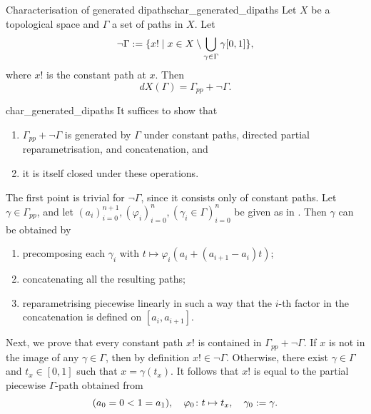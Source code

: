 \begin{clem}{Characterisation of generated dipaths}{char_generated_dipaths}
	Let \( X \) be a topological space and \( \Gamma \) a set of paths in \( X \).
	Let
	\begin{equation*}
		\neg \Gamma :=
		\{ x! \mid x \in X \setminus \bigcup_{\gamma \in \Gamma} \gamma[0, 1] \},
	\end{equation*}
	where \( x! \) is the constant path at \( x \).
	Then
	\begin{equation*}
		dX(\Gamma) = \Gamma_\textit{pp} + \neg \Gamma.
	\end{equation*}
\end{clem}
\begin{lemproof}{char_generated_dipaths}
It suffices to show that
\begin{enumerate}
	\item \( \Gamma_\textit{pp} + \neg \Gamma \) is generated by \( \Gamma \) under constant paths, directed partial reparametrisation, and concatenation, and
	\item it is itself closed under these operations.
\end{enumerate}
The first point is trivial for \( \neg \Gamma \), since it consists only of constant paths.
Let \( \gamma \in \Gamma_\textit{pp} \), and let \( (a_i)_{i=0}^{n+1}, (\varphi_i)_{i=0}^n, (\gamma_i \in \Gamma)_{i=0}^n \) be given as in .
Then \( \gamma \) can be obtained by
\begin{enumerate}
	\item precomposing each \( \gamma_i \) with \( t \mapsto \varphi_i(a_i + (a_{i+1} - a_i)t) \);
	\item concatenating all the resulting paths;
	\item reparametrising piecewise linearly in such a way that the \( i \)-th factor in the concatenation is defined on \( [a_i, a_{i+1}] \).
\end{enumerate}
Next, we prove that every constant path \( x! \) is contained in \( \Gamma_\textit{pp} + \neg \Gamma \).
If \( x \) is not in the image of any \( \gamma \in \Gamma \), then by definition \( x! \in \neg \Gamma \).
Otherwise, there exist \( \gamma \in \Gamma \) and \( t_x \in [0, 1] \) such that \( x = \gamma(t_x) \).
It follows that \( x! \) is equal to the partial piecewise \( \Gamma \)-path obtained from
\begin{equation*}
	(a_0 = 0 < 1 = a_1), \quad \varphi_0\colon t \mapsto t_x, \quad \gamma_0 := \gamma.
\end{equation*}


\end{lemproof}
